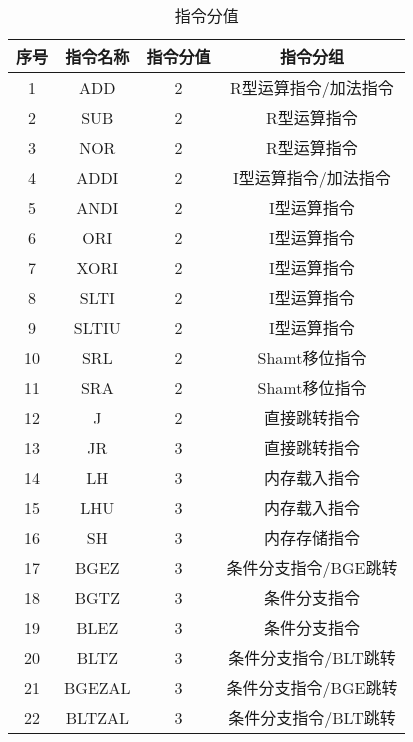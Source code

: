 \begin{table}
    \centering
    \caption{指令分值}\label{tab: x1}
    \begin{tabular}{cccc}
        \toprule
        {\bfseries 序号} &  {\bfseries 指令名称} &  {\bfseries 指令分值} &  {\bfseries 指令分组}\\ 
        \midrule
        1       &   ADD     &   2       &       R型运算指令/加法指令        \\
        2       &   SUB     &   2       &       R型运算指令     \\
        3       &   NOR     &   2       &       R型运算指令     \\
        4       &   ADDI    &  2        &       I型运算指令/加法指令        \\
        5       &   ANDI    &  2        &       I型运算指令     \\
        6       &   ORI     &   2       &       I型运算指令     \\
        7       &   XORI    &  2        &       I型运算指令     \\
        8       &   SLTI    &  2        &       I型运算指令     \\
        9       &   SLTIU   &     2     &       I型运算指令     \\
        10      &   SRL     &   2       &       Shamt移位指令       \\
        11      &   SRA     &   2       &       Shamt移位指令       \\
        12      &   J   &     2     &       直接跳转指令        \\
        13      &   JR  &    3      &       直接跳转指令        \\
        14      &   LH  &    3      &       内存载入指令        \\
        15      &   LHU     &   3       &       内存载入指令        \\
        16      &   SH  &    3      &       内存存储指令        \\
        17      &   BGEZ    &  3        &       条件分支指令/BGE跳转        \\
        18      &   BGTZ    &  3        &       条件分支指令        \\
        19      &   BLEZ    &  3        &       条件分支指令        \\
        20      &   BLTZ    &  3        &       条件分支指令/BLT跳转        \\
        21      &   BGEZAL  &    3      &       条件分支指令/BGE跳转        \\
        22      &   BLTZAL  &    3      &       条件分支指令/BLT跳转        \\
        \bottomrule
    \end{tabular}
\end{table}

